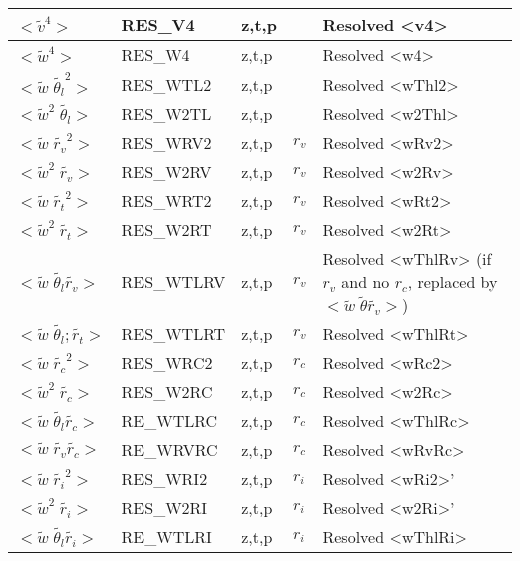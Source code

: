 \begin{longtable}[c]{|p{}|p{}|p{}|p{}|p{}|}
$<\tilde{v}^4>$                                      & RES\_V4    & z,t,p   &       & Resolved <v4> \\\hline
$<\tilde{w}^4>$                                      & RES\_W4    & z,t,p   &       & Resolved <w4> \\\hline
$<\tilde{w}\;\tilde{\theta_l}^2>$                    & RES\_WTL2  & z,t,p   &       & Resolved <wThl2>\\\hline
$<\tilde{w}^2\;\tilde{\theta_l}>$                    & RES\_W2TL  & z,t,p   &       & Resolved <w2Thl>\\\hline
$<\tilde{w}\;\tilde{r_v}^2>$                         & RES\_WRV2  & z,t,p   & $r_v$ & Resolved <wRv2> \\\hline
$<\tilde{w}^2\;\tilde{r_v}>$                         & RES\_W2RV  & z,t,p   & $r_v$ & Resolved <w2Rv> \\\hline
$<\tilde{w}\;\tilde{r_t}^2>$                         & RES\_WRT2  & z,t,p   & $r_v$ & Resolved <wRt2> \\\hline
$<\tilde{w}^2\;\tilde{r_t}>$                         & RES\_W2RT  & z,t,p   & $r_v$ & Resolved <w2Rt> \\\hline
$<\tilde{w}\;\tilde{\theta_l}\tilde{r_v}>$           & RES\_WTLRV & z,t,p   & $r_v$ & Resolved <wThlRv> (if $r_v$ and no $r_c$, replaced by $<\tilde{w}\;\tilde{\theta}\tilde{r_v}>$) \\\hline
$<\tilde{w}\;\tilde{\theta_l};\tilde{r_t}>$          & RES\_WTLRT & z,t,p   & $r_v$ & Resolved <wThlRt> \\\hline
$<\tilde{w}\;\tilde{r_c}^2>$                         & RES\_WRC2  & z,t,p   & $r_c$ & Resolved <wRc2> \\\hline
$<\tilde{w}^2\;\tilde{r_c}>$                         & RES\_W2RC  & z,t,p   & $r_c$ & Resolved <w2Rc> \\\hline
$<\tilde{w}\;\tilde{\theta_l}\tilde{r_c}>$           & RE\_WTLRC & z,t,p    & $r_c$ & Resolved <wThlRc> \\\hline
$<\tilde{w}\;\tilde{r_v}\tilde{r_c}>$                & RE\_WRVRC  & z,t,p   & $r_c$ & Resolved <wRvRc> \\\hline
$<\tilde{w}\;\tilde{r_i}^2>$                         & RES\_WRI2  & z,t,p   & $r_i$ & Resolved <wRi2>' \\\hline
$<\tilde{w}^2\;\tilde{r_i}>$                         & RES\_W2RI  & z,t,p   & $r_i$ & Resolved <w2Ri>' \\\hline
$<\tilde{w}\;\tilde{\theta_l}\tilde{r_i}>$           & RE\_WTLRI  & z,t,p   & $r_i$ & Resolved <wThlRi> \\\hline

\end{longtable}
